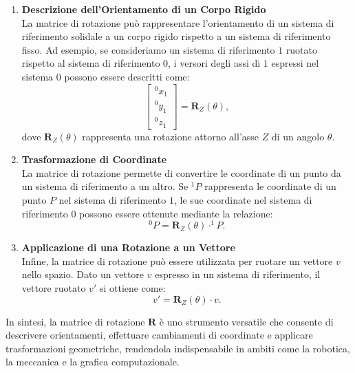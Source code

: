 ﻿\documentclass[11pt, a4paper]{article}
\begin{document}
\begin{enumerate}
    \item \textbf{Descrizione dell'Orientamento di un Corpo Rigido} \\
    La matrice di rotazione può rappresentare l'orientamento di un sistema di riferimento solidale a un corpo rigido rispetto a un sistema di riferimento fisso. Ad esempio, se consideriamo un sistema di riferimento $1$ ruotato rispetto al sistema di riferimento $0$, i versori degli assi di $1$ espressi nel sistema $0$ possono essere descritti come:
    \[
    \begin{bmatrix}
    ^{0}x_{1} \\
    ^{0}y_{1} \\
    ^{0}z_{1}
    \end{bmatrix}
    = \mathbf{R}_{Z}(\theta),
    \]
    dove $\mathbf{R}_{Z}(\theta)$ rappresenta una rotazione attorno all'asse $Z$ di un angolo $\theta$.

    \item \textbf{Trasformazione di Coordinate} \\
    La matrice di rotazione permette di convertire le coordinate di un punto da un sistema di riferimento a un altro. Se $^{1}P$ rappresenta le coordinate di un punto $P$ nel sistema di riferimento $1$, le sue coordinate nel sistema di riferimento $0$ possono essere ottenute mediante la relazione:
    \[
    ^{0}P = \mathbf{R}_{Z}(\theta) \cdot ^{1}P.
    \]

    \item \textbf{Applicazione di una Rotazione a un Vettore} \\
    Infine, la matrice di rotazione può essere utilizzata per ruotare un vettore $v$ nello spazio. Dato un vettore $v$ espresso in un sistema di riferimento, il vettore ruotato $v'$ si ottiene come:
    \[
    v' = \mathbf{R}_{Z}(\theta) \cdot v.
    \]
\end{enumerate}

In sintesi, la matrice di rotazione $\mathbf{R}$ è uno strumento versatile che consente di descrivere orientamenti, effettuare cambiamenti di coordinate e applicare trasformazioni geometriche, rendendola indispensabile in ambiti come la robotica, la meccanica e la grafica computazionale.
\end{document}
